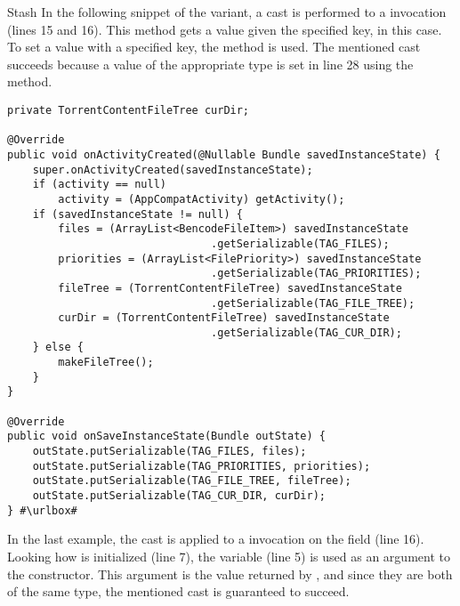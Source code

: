 \begin{pattern}{Stash}
In the following snippet of the  variant,
a cast is performed to a  invocation (lines 15 and 16).
This method gets a  value given the specified key,  in this case.
To set a value with a specified key, the  method is used.
The mentioned cast succeeds because a value of the appropriate type is set in line 28 using the  method.

\def\urlvar{http://bit.ly/proninyaroslav_libretorrent_2TxpZCM}
\begin{verbatim}
private TorrentContentFileTree curDir;

@Override
public void onActivityCreated(@Nullable Bundle savedInstanceState) {
    super.onActivityCreated(savedInstanceState);
    if (activity == null)
        activity = (AppCompatActivity) getActivity();
    if (savedInstanceState != null) {
        files = (ArrayList<BencodeFileItem>) savedInstanceState
                                .getSerializable(TAG_FILES);
        priorities = (ArrayList<FilePriority>) savedInstanceState
                                .getSerializable(TAG_PRIORITIES);
        fileTree = (TorrentContentFileTree) savedInstanceState
                                .getSerializable(TAG_FILE_TREE);
        curDir = (TorrentContentFileTree) savedInstanceState
                                .getSerializable(TAG_CUR_DIR);
    } else {
        makeFileTree();
    }
}

@Override
public void onSaveInstanceState(Bundle outState) {
    outState.putSerializable(TAG_FILES, files);
    outState.putSerializable(TAG_PRIORITIES, priorities);
    outState.putSerializable(TAG_FILE_TREE, fileTree);
    outState.putSerializable(TAG_CUR_DIR, curDir);
} #\urlbox#
\end{verbatim}

In the last example,
the cast is applied to a  invocation on the  field (line 16).
Looking how  is initialized (line 7),
the  variable (line 5) is used as an argument to the constructor.
This argument is the value returned by ,
and since they are both of the same type,
the mentioned cast is guaranteed to succeed.


\end{pattern}
